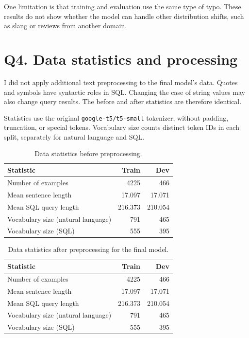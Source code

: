 \documentclass[11pt]{article}
\begin{document}
One limitation is that training and evaluation use the same type of typo. These results do not show whether the model can handle other distribution shifts, such as slang or reviews from another domain.

\newpage
\section{Q4. Data statistics and processing}
I did not apply additional text preprocessing to the final model's data. Quotes and symbols have syntactic roles in SQL. Changing the case of string values may also change query results. The before and after statistics are therefore identical.

Statistics use the original \texttt{google-t5/t5-small} tokenizer, without padding, truncation, or special tokens. Vocabulary size counts distinct token IDs in each split, separately for natural language and SQL.

\begin{table}[h]\centering
\begin{tabular}{lrr}\toprule
Statistic & Train & Dev\\\midrule
Number of examples & 4225 & 466\\
Mean sentence length & 17.097 & 17.071\\
Mean SQL query length & 216.373 & 210.054\\
Vocabulary size (natural language) & 791 & 465\\
Vocabulary size (SQL) & 555 & 395\\\bottomrule
\end{tabular}
\caption{Data statistics before preprocessing.}
\end{table}
\begin{table}[h]\centering
\begin{tabular}{lrr}\toprule
Statistic & Train & Dev\\\midrule
Number of examples & 4225 & 466\\
Mean sentence length & 17.097 & 17.071\\
Mean SQL query length & 216.373 & 210.054\\
Vocabulary size (natural language) & 791 & 465\\
Vocabulary size (SQL) & 555 & 395\\\bottomrule
\end{tabular}
\caption{Data statistics after preprocessing for the final model.}
\end{table}
\end{document}
